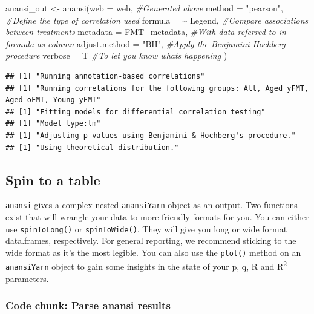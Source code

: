 \documentclass[
]{article}
\newenvironment{Shaded}{\begin{snugshade}}{\end{snugshade}}
\newcommand{\AttributeTok}[1]{\textcolor[rgb]{0.77,0.63,0.00}{#1}}
\newcommand{\CommentTok}[1]{\textcolor[rgb]{0.56,0.35,0.01}{\textit{#1}}}
\newcommand{\FunctionTok}[1]{\textcolor[rgb]{0.00,0.00,0.00}{#1}}
\newcommand{\NormalTok}[1]{#1}
\newcommand{\OtherTok}[1]{\textcolor[rgb]{0.56,0.35,0.01}{#1}}
\newcommand{\SpecialCharTok}[1]{\textcolor[rgb]{0.00,0.00,0.00}{#1}}
\newcommand{\StringTok}[1]{\textcolor[rgb]{0.31,0.60,0.02}{#1}}
\begin{document}
\begin{Shaded}
\begin{Highlighting}[]
\NormalTok{anansi\_out }\OtherTok{\textless{}{-}} \FunctionTok{anansi}\NormalTok{(}\AttributeTok{web      =}\NormalTok{ web,          }\CommentTok{\#Generated above}
                     \AttributeTok{method   =} \StringTok{"pearson"}\NormalTok{,    }\CommentTok{\#Define the type of correlation used}
                     \AttributeTok{formula  =} \SpecialCharTok{\textasciitilde{}}\NormalTok{ Legend,     }\CommentTok{\#Compare associations between treatments}
                     \AttributeTok{metadata =}\NormalTok{ FMT\_metadata, }\CommentTok{\#With data referred to in formula as column}
                     \AttributeTok{adjust.method =} \StringTok{"BH"}\NormalTok{,    }\CommentTok{\#Apply the Benjamini{-}Hochberg procedure}
                     \AttributeTok{verbose  =}\NormalTok{ T             }\CommentTok{\#To let you know what\textquotesingle{}s happening}
\NormalTok{                     )}
\end{Highlighting}
\end{Shaded}

\begin{verbatim}
## [1] "Running annotation-based correlations"
## [1] "Running correlations for the following groups: All, Aged yFMT, Aged oFMT, Young yFMT"
## [1] "Fitting models for differential correlation testing"
## [1] "Model type:lm"
## [1] "Adjusting p-values using Benjamini & Hochberg's procedure."
## [1] "Using theoretical distribution."
\end{verbatim}

\hypertarget{spin-to-a-table}{%
\subsection{Spin to a table}\label{spin-to-a-table}}

\texttt{anansi} gives a complex nested \texttt{anansiYarn} object as an
output. Two functions exist that will wrangle your data to more friendly
formats for you. You can either use \texttt{spinToLong()} or
\texttt{spinToWide()}. They will give you long or wide format
data.frames, respectively. For general reporting, we recommend sticking
to the wide format as it's the most legible. You can also use the
\texttt{plot()} method on an \texttt{anansiYarn} object to gain some
insights in the state of your p, q, R and R\textsuperscript{2}
parameters.

\hypertarget{code-chunk-parse-anansi-results}{%
\subsubsection{Code chunk: Parse anansi
results}\label{code-chunk-parse-anansi-results}}
\end{document}
